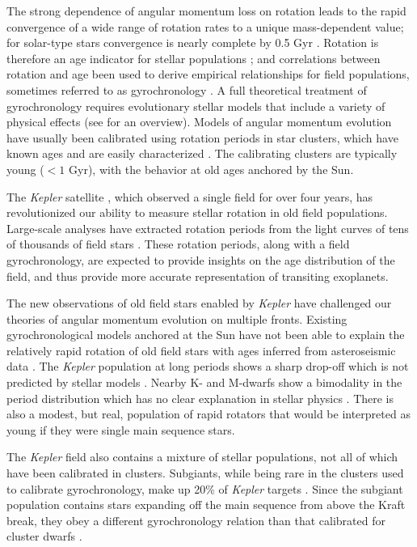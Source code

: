 \documentclass[manuscript]{aastex6}
\newcommand{\Kepler}{\mbox{\textit{Kepler}}}
\begin{document}
The strong dependence of angular momentum loss on rotation \citep{Kawaler88}
leads to the rapid convergence of a wide range of rotation rates to a unique
mass-dependent value; for solar-type stars convergence is nearly complete by
0.5 Gyr \citep{Pinsonneault89}. Rotation is therefore an age indicator for 
stellar populations \citep{Skumanich72}; and correlations between rotation and
age been used to derive empirical relationships for field populations, 
sometimes referred to as gyrochronology \citep{Barnes07, Mamajek08, Meibom09}.  
A full theoretical treatment of gyrochronology requires evolutionary stellar 
models that include a variety of physical effects (see \citet{Gallet13} for an
overview). Models of angular momentum evolution have usually been calibrated 
using rotation periods in star clusters, which have known ages and are easily 
characterized \citep{Krishnamurthi97, Gallet13, Somers17}. The calibrating 
clusters are typically young (\(< 1\) Gyr), with the behavior at old ages anchored by the Sun. 

The \Kepler{} satellite \citep{Borucki10,Koch10}, which observed a single field
for over four years, has revolutionized our ability to measure stellar 
rotation in old field populations. Large-scale analyses have extracted 
rotation periods from the light curves of tens of thousands of field stars
\citep{Nielsen13, Reinhold13, Garcia14, McQuillan14}. These rotation periods, 
along with a field gyrochronology, are expected to provide insights on the age 
distribution of the field, and thus provide more accurate representation of 
transiting exoplanets.

The new observations of old field stars enabled by \Kepler{} have challenged 
our theories of angular momentum evolution on multiple fronts. Existing 
gyrochronological models anchored at the Sun have not been able to explain
the relatively rapid rotation of old field stars with ages inferred from
asteroseismic data \citep{Angus15, VanSaders16}. The \Kepler{} population at 
long periods shows a sharp drop-off which is not predicted by stellar models 
\citep{VanSaders18}.  Nearby K- and M-dwarfs show a bimodality in the period 
distribution which has no clear explanation in stellar physics 
\citep{Davenport18}. There is also a modest, but real, population of rapid 
rotators that would be interpreted as young if they were single main sequence 
stars.

The \Kepler{} field also contains a mixture of stellar populations, not all of 
which have been calibrated in clusters. Subgiants, while being rare in the 
clusters used to calibrate gyrochronology, 
make up 20\% of \Kepler{} targets \citep{Berger18b}. Since the 
subgiant population contains stars expanding off the main sequence from 
above the Kraft break, they obey a different gyrochronology relation than that 
calibrated for cluster dwarfs \citep{vanSaders13}. 
\end{document}
